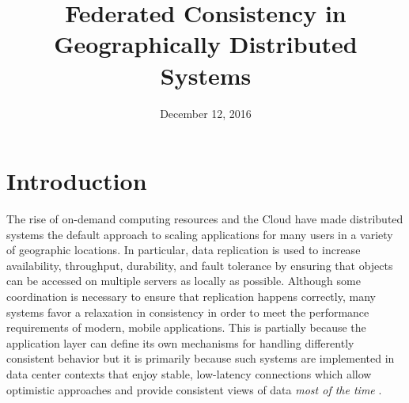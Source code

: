 \documentclass[10pt,conference,letterpaper]{IEEEtran}
\begin{document}
\title{Federated Consistency in Geographically Distributed Systems}
\author{
}


\date{December 12, 2016}


\maketitle

\IEEEdisplaynotcompsoctitleabstractindextext

\section{Introduction}

The rise of on-demand computing resources and the Cloud have made distributed systems the default approach to scaling applications for many users in a variety of geographic locations. In particular, data replication is used to increase availability, throughput, durability, and fault tolerance by ensuring that objects can be accessed on multiple servers as locally as possible. Although some coordination is necessary to ensure that replication happens correctly, many systems favor a relaxation in consistency in order to meet the performance requirements of modern, mobile applications. This is partially because the application layer can define its own mechanisms for handling differently consistent behavior but it is primarily because such systems are implemented in data center contexts that enjoy stable, low-latency connections which allow optimistic approaches and provide consistent views of data \emph{most of the time} \cite{bailis_quantifying_2014,bermbach_metastorage:_2011}.
\end{document}
